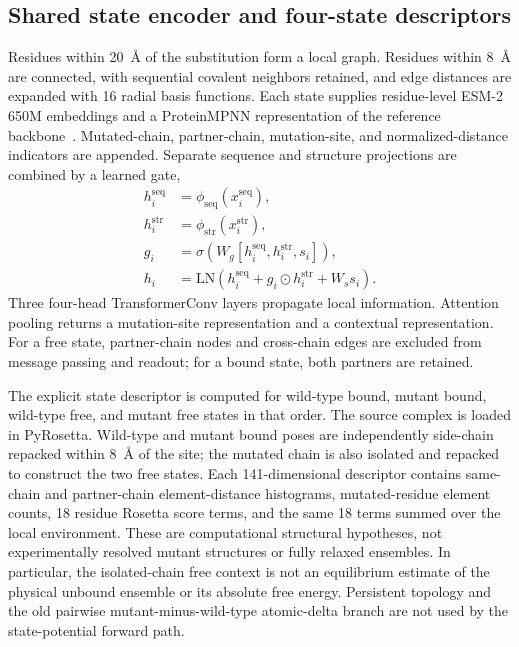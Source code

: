 \documentclass[preprint,12pt]{elsarticle}
\begin{document}
\subsection{Shared state encoder and four-state descriptors}

Residues within 20~\AA{} of the substitution form a local graph. Residues within 8~\AA{} are connected, with sequential covalent neighbors retained, and edge distances are expanded with 16 radial basis functions. Each state supplies residue-level ESM-2 650M embeddings and a ProteinMPNN representation of the reference backbone~\cite{esm2,proteinmpnn}. Mutated-chain, partner-chain, mutation-site, and normalized-distance indicators are appended. Separate sequence and structure projections are combined by a learned gate,
\begin{align}
 h_i^{\mathrm{seq}} &= \phi_{\mathrm{seq}}(x_i^{\mathrm{seq}}), \\
 h_i^{\mathrm{str}} &= \phi_{\mathrm{str}}(x_i^{\mathrm{str}}), \\
 g_i &= \sigma\!\left(W_g[h_i^{\mathrm{seq}},h_i^{\mathrm{str}},s_i]\right), \\
 h_i &= \mathrm{LN}\!\left(h_i^{\mathrm{seq}}+g_i\odot h_i^{\mathrm{str}}+W_s s_i\right).
\end{align}
Three four-head TransformerConv layers propagate local information. Attention pooling returns a mutation-site representation and a contextual representation. For a free state, partner-chain nodes and cross-chain edges are excluded from message passing and readout; for a bound state, both partners are retained.

The explicit state descriptor is computed for wild-type bound, mutant bound, wild-type free, and mutant free states in that order. The source complex is loaded in PyRosetta. Wild-type and mutant bound poses are independently side-chain repacked within 8~\AA{} of the site; the mutated chain is also isolated and repacked to construct the two free states. Each 141-dimensional descriptor contains same-chain and partner-chain element-distance histograms, mutated-residue element counts, 18 residue Rosetta score terms, and the same 18 terms summed over the local environment. These are computational structural hypotheses, not experimentally resolved mutant structures or fully relaxed ensembles. In particular, the isolated-chain free context is not an equilibrium estimate of the physical unbound ensemble or its absolute free energy. Persistent topology and the old pairwise mutant-minus-wild-type atomic-delta branch are not used by the state-potential forward path.
\end{document}
